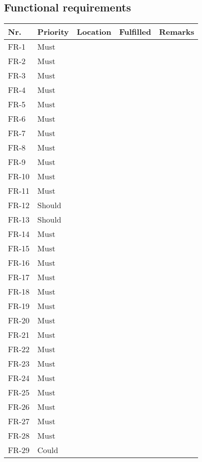 \subsection{Functional requirements}
\begin{table}[H]
	\begin{tabular}{lllll}
						    
		Nr.   & Priority & Location & Fulfilled & Remarks \\ \hline
		FR-1  & Must     & ~        & ~         & ~       \\ 
		FR-2  & Must     & ~        & ~         & ~       \\ 
		FR-3  & Must     & ~        & ~         & ~       \\ 
		FR-4  & Must     & ~        & ~         & ~       \\ 
		FR-5  & Must     & ~        & ~         & ~       \\ 
		FR-6  & Must     & ~        & ~         & ~       \\ 
		FR-7  & Must     & ~        & ~         & ~       \\ 
		FR-8  & Must     & ~        & ~         & ~       \\ 
		FR-9  & Must     & ~        & ~         & ~       \\ 
		FR-10 & Must     & ~        & ~         & ~       \\ 
		FR-11 & Must     & ~        & ~         & ~       \\ 
		FR-12 & Should   & ~        & ~         & ~       \\ 
		FR-13 & Should   & ~        & ~         & ~       \\ 
		FR-14 & Must     & ~        & ~         & ~       \\ 
		FR-15 & Must     & ~        & ~         & ~       \\ 
		FR-16 & Must     & ~        & ~         & ~       \\ 
		FR-17 & Must     & ~        & ~         & ~       \\ 
		FR-18 & Must     & ~        & ~         & ~       \\ 
		FR-19 & Must     & ~        & ~         & ~       \\ 
		FR-20 & Must     & ~        & ~         & ~       \\ 
		FR-21 & Must     & ~        & ~         & ~       \\ 
		FR-22 & Must     & ~        & ~         & ~       \\ 
		FR-23 & Must     & ~        & ~         & ~       \\ 
		FR-24 & Must     & ~        & ~         & ~       \\ 
		FR-25 & Must     & ~        & ~         & ~       \\ 
		FR-26 & Must     & ~        & ~         & ~       \\ 
		FR-27 & Must     & ~        & ~         & ~       \\ 
		FR-28 & Must     & ~        & ~         & ~       \\ 
		FR-29 & Could    & ~        & ~         & ~       \\
						

\end{tabular}
\end{table}

